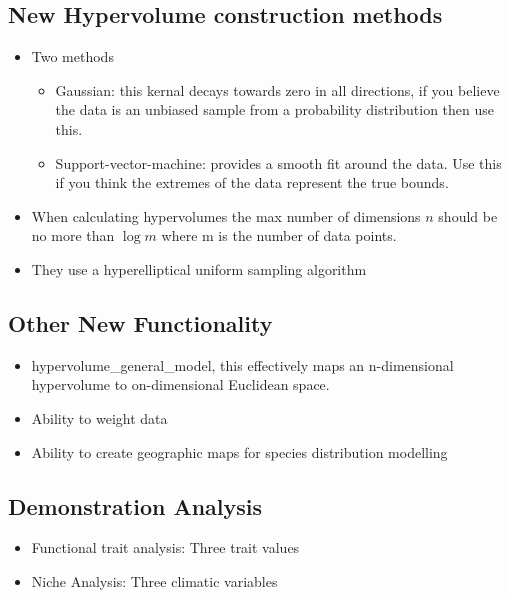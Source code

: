 \subsection*{New Hypervolume construction methods}
\begin{itemize}
	\item Two methods  
	\begin{itemize}
		\item Gaussian: this kernal decays towards zero in all directions, if you believe the data is an unbiased sample from a probability distribution then use this.
		\item Support-vector-machine: provides a smooth fit around the data. Use this if you think the extremes of the data represent the true bounds.
	\end{itemize}
	\item When calculating hypervolumes the max number of dimensions $n$ should be no more than $\log{m}$ where m is the number of data points.
	\item They use a hyperelliptical uniform sampling algorithm 
\end{itemize}

\subsection*{Other New Functionality}
\begin{itemize}
	\item hypervolume\_general\_model, this effectively maps an n-dimensional hypervolume to on-dimensional Euclidean space.
	\item Ability to weight data
	\item Ability to create geographic maps for species distribution modelling
\end{itemize}

\subsection*{Demonstration Analysis}
\begin{itemize}
	\item Functional trait analysis: Three trait values
	\item Niche Analysis: Three climatic variables
\end{itemize}
